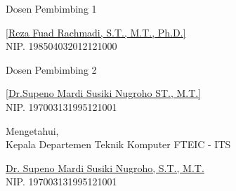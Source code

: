 \begin{center}

  \begin{multicols}{2}

    Dosen Pembimbing 1
    \vspace{12ex}

    \underline{[Reza Fuad Rachmadi, S.T., M.T., Ph.D.]} \\
    NIP. 198504032012121000

    \columnbreak

    Dosen Pembimbing 2
    \vspace{12ex}

    \underline{[Dr.Supeno Mardi Susiki Nugroho ST., M.T.]} \\
    NIP. 197003131995121001

  \end{multicols}
  \vspace{6ex}

  Mengetahui, \\
  Kepala Departemen Teknik Komputer FTEIC - ITS
  \vspace{12ex}

  \underline{Dr. Supeno Mardi Susiki Nugroho, S.T., M.T.} \\
  NIP. 197003131995121001

\end{center}